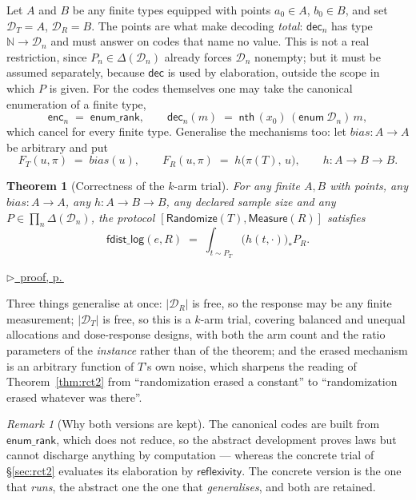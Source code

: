 \documentclass[11pt,a4paper]{article}
\theoremstyle{definition}
\theoremstyle{plain}
\newtheorem{theorem}[definition]{Theorem}
\theoremstyle{remark}
\newtheorem{remark}[definition]{Remark}
\newcommand{\dom}{\mathcal{D}}
\newcommand{\enc}{\mathsf{enc}}
\newcommand{\dect}{\mathsf{dec}}
\newcommand{\Dist}[1]{\Delta(#1)}      %
\newcommand{\push}[1]{{#1}_{*}}        %
\newcommand{\pfref}[1]{%
  \par\smallskip\noindent
  \hyperref[pf:#1]{\small$\triangleright$\ proof, p.\,\pageref{pf:#1}}\par\smallskip}
\begin{document}
Let $A$ and $B$ be any finite types equipped with points $a_0 \in A$,
$b_0 \in B$, and set $\dom_T = A$, $\dom_R = B$. The points are what make
decoding \emph{total}: $\dect_n$ has type $\mathbb{N} \to \dom_n$ and must
answer on codes that name no value. This is not a real restriction, since
$P_n \in \Dist{\dom_n}$ already forces $\dom_n$ nonempty; but it must be
assumed separately, because $\dect$ is used by elaboration, outside the
scope in which $P$ is given. For the codes themselves one may take the
canonical enumeration of a finite type,
\[
  \enc_n \;=\; \mathsf{enum\_rank},
  \qquad
  \dect_n(m) \;=\; \mathsf{nth}\,(x_0)\,(\mathsf{enum}\ \dom_n)\,m ,
\]
which cancel for every finite type. Generalise the mechanisms too: let
$\mathit{bias} : A \to A$ be arbitrary and put
\[
  F_T(u,\pi) \;=\; \mathit{bias}(u),
  \qquad
  F_R(u,\pi) \;=\; h\bigl(\pi(T),\, u\bigr),
  \qquad
  h : A \to B \to B .
\]

\begin{theorem}[Correctness of the $k$-arm trial]
\label{thm:rct2gen}
For any finite $A, B$ with points, any $\mathit{bias} : A \to A$, any
$h : A \to B \to B$, any declared sample size and any
$P \in \prod_n \Dist{\dom_n}$, the protocol
$[\mathsf{Randomize}(T), \mathsf{Measure}(R)]$ satisfies
\[
  \mathsf{fdist\_log}(e, R)
  \;=\;
  \int_{t \sim P_T} \push{\bigl(h(t,\cdot)\bigr)} P_R .
\]
\end{theorem}

\pfref{thm:rct2gen}

Three things generalise at once: $|\dom_R|$ is free, so the response may be
any finite measurement; $|\dom_T|$ is free, so this is a $k$-arm trial,
covering balanced and unequal allocations and dose-response designs, with
both the arm count and the ratio parameters of the \emph{instance} rather
than of the theorem; and the erased mechanism is an arbitrary function of
$T$'s own noise, which sharpens the reading of Theorem~\ref{thm:rct2} from
``randomization erased a constant'' to ``randomization erased whatever was
there''.

\begin{remark}[Why both versions are kept]
The canonical codes are built from $\mathsf{enum\_rank}$, which does not
reduce, so the abstract development proves laws but cannot discharge
anything by computation --- whereas the concrete trial of
\S\ref{sec:rct2} evaluates its elaboration by $\mathsf{reflexivity}$. The
concrete version is the one that \emph{runs}, the abstract one the one
that \emph{generalises}, and both are retained.
\end{remark}
\end{document}

